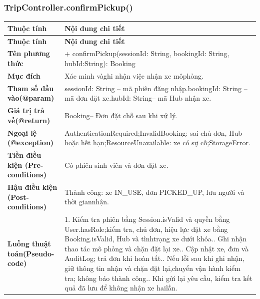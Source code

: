 \subsubsection{TripController.confirmPickup()}
\begin{longtable}{|L{0.24\textwidth}|L{0.70\textwidth}|}
\hline
\textbf{Thuộc tính} & \textbf{Nội dung chi tiết} \\
\hline
\endfirsthead
\hline
\textbf{Thuộc tính} & \textbf{Nội dung chi tiết} \\
\hline
\endhead
\textbf{Tên phương thức} & + confirmPickup(sessionId: String, bookingId: String, hubId:\newline String): Booking \\
\hline
\textbf{Mục đích} & Xác minh vàghi nhận việc nhận xe môphỏng. \\
\hline
\textbf{Tham số đầu vào}\newline \textbf{(@param)} & sessionId: String – mã phiên đăng nhập.\newline bookingId: String – mã đơn đặt xe.\newline hubId: String– mã Hub nhận xe. \\
\hline
\textbf{Giá trị trả về(@return)} & Booking– Đơn đặt chỗ sau khi xử lý. \\
\hline
\textbf{Ngoại lệ (@exception)} & AuthenticationRequired;\newline InvalidBooking: sai chủ đơn, Hub hoặc hết hạn;\newline ResourceUnavailable: xe có sự cố;\newline StorageError. \\
\hline
\textbf{Tiền điều kiện (Pre-}\newline \textbf{conditions)} & Có phiên sinh viên và đơn đặt xe. \\
\hline
\textbf{Hậu điều kiện (Post-}\newline \textbf{conditions)} & Thành công: xe IN\_USE, đơn PICKED\_UP, lưu người và thời gian\newline nhận. \\
\hline
\textbf{Luồng thuật toán}\newline \textbf{(Pseudo-code)} & 1. Kiểm tra phiên bằng Session.isValid và quyền bằng User.hasRole;\newline kiểm tra, chủ đơn, hiệu lực đặt xe bằng Booking.isValid, Hub và tình\newline trạng xe dưới khóa.. Ghi nhận thao tác mô phỏng và chặn đặt lại xe.. Cập nhật xe, đơn và AuditLog; trả đơn khi hoàn tất.. Nếu lỗi sau khi ghi nhận, giữ thông tin nhận và chặn đặt lại,\newline chuyển vận hành kiểm tra; không báo thành công.. Khi gửi lại yêu cầu, kiểm tra kết quả đã lưu để không nhận xe hai\newline lần. \\
\hline
\end{longtable}
\vspace{-0.5\baselineskip}
